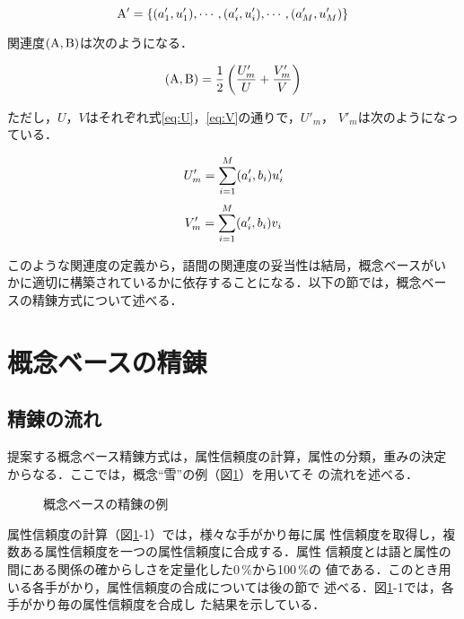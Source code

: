 \begin{equation}
  {\rm A}' = \{(a'_1, u'_1), \cdots , (a'_i, u'_i),\cdots , (a'_M, u'_M)\}
  \label{eq:conceptA'}
\end{equation}

関連度$ ({\rm A}, {\rm B})$は次のようになる．

\begin{equation}
   ({\rm A}, {\rm B}) = \frac{1}{2}\left( \frac{U'_m}{U}+\frac{V'_m}{V}\right)
  \label{eq:Rel}
\end{equation}

ただし，$U$，$V$はそれぞれ式\ref{eq:U}，\ref{eq:V}の通りで，$U'_m$，
$V'_m$は次のようになっている．

\begin{equation}
  U'_m = \sum_{i=1}^{M} (a'_i,b_i)u'_i \label{eq:U'_m}
\end{equation}
\begin{equation}
  V'_m = \sum_{i=1}^{M} (a'_i,b_i)v_i \label{eq:V'_m}
\end{equation}

このような関連度の定義から，語間の関連度の妥当性は結局，概念ベースがい
かに適切に構築されているかに依存することになる．以下の節では，概念ベー
スの精錬方式について述べる．

\section{概念ベースの精錬}

\subsection{精錬の流れ}

提案する概念ベース精錬方式は，属性信頼度の計算，属性の分類，重みの決定
からなる．ここでは，概念“雪”の例（図\ref{fig:refine_cb}）を用いてそ
の流れを述べる．

\begin{figure}[ht]
  \begin{center}
    \caption{概念ベースの精錬の例}
    \label{fig:refine_cb}
  \end{center}
\end{figure}

属性信頼度の計算（図\ref{fig:refine_cb}-1）では，様々な手がかり毎に属
性信頼度を取得し，複数ある属性信頼度を一つの属性信頼度に合成する．属性
信頼度とは語と属性の間にある関係の確からしさを定量化した0\,\%から100\,\%の
値である．このとき用いる各手がかり，属性信頼度の合成については後の節で
述べる．図\ref{fig:refine_cb}-1では，各手がかり毎の属性信頼度を合成し
た結果を示している．

